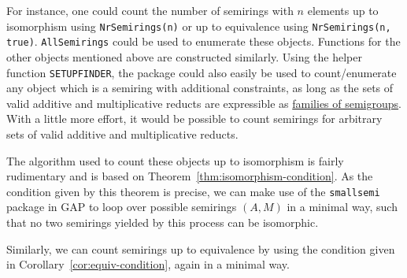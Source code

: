 \documentclass{article}
\theoremstyle{definition}
\theoremstyle{plain}
\begin{document}
For instance, one could count the number of semirings with \(n\)
elements up to isomorphism using \texttt{NrSemirings(n)} or up to
equivalence using \texttt{NrSemirings(n, true)}.
\texttt{AllSemirings} could be used to enumerate these objects.
Functions for the other objects mentioned above are constructed
similarly. Using the helper function \texttt{SETUPFINDER}, the
package could also easily be used to count/enumerate any object which
is a semiring with additional constraints, as long as the sets of
valid additive and multiplicative reducts are expressible as
\href{https://gap-packages.github.io/smallsemi/doc/chap4_mj.html#X82F9C36C86006857}{families
of semigroups}. With a little more effort, it would be possible to
count semirings for arbitrary sets of valid additive and multiplicative reducts.

The algorithm used to count these objects up to isomorphism is fairly
rudimentary and is based on Theorem~\ref{thm:isomorphism-condition}.
As the condition given by this theorem is precise, we can make use of
the \texttt{smallsemi} package in GAP to loop over possible semirings
\((A, M)\) in a minimal way, such that no two semirings yielded by
this process can be isomorphic.

Similarly, we can count semirings up to equivalence by using the
condition given in Corollary~\ref{cor:equiv-condition}, again in a minimal way.
\end{document}
